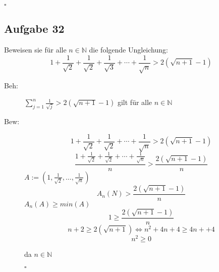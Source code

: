 \documentclass[12pt,a4paper,leqno]{article}
\begin{document}
\begin{description}
\begin{description}
			\begin{flushright}$ \square $ \end{flushright}
		\end{description}
\end{description}

\subsection*{Aufgabe 32}
Beweisen sie für alle $n \in \mathbb{N}$ die folgende Ungleichung:
$$ 1+ \frac{1}{\sqrt{2}}+\frac{1}{\sqrt{2}}+\frac{1}{\sqrt{3}}+ \cdots + \frac{1}{\sqrt{n}}> 2(\sqrt{n+1}-1)$$
\begin{description}
	\item[Beh: ]$ \sum \limits _{j =1}^n \frac{1}{\sqrt{j}}>2(\sqrt{n+1} -1) $ gilt für alle $n \in \mathbb{N}$
	\item[Bew: ]
	$$ 1+ \frac{1}{\sqrt{2}}+\frac{1}{\sqrt{2}}+ \cdots + \frac{1}{\sqrt{n}}> 2(\sqrt{n+1}-1) $$
	$$ \frac{1+ \frac{1}{\sqrt{2}}+\frac{1}{\sqrt{2}}+ \cdots + \frac{1}{\sqrt{n}}}{n} > \frac{2(\sqrt{n+1} -1)}{n} $$
	$A:=(1,\frac{1}{\sqrt{2}} , \ldots , \frac{1}{\sqrt{n}})$
	$$A_{n}(N)> \frac{2(\sqrt{n+1} -1)}{n} $$
	$A_{n}(A)\geq min(A)$
	$$1 \geq \frac{2(\sqrt{n+1} -1)}{n}$$
	$$n+2 \geq 2(\sqrt{n+1}) \Leftrightarrow n^2 +4n+4 \geq 4n+ +4 $$
	$$n^2 \geq 0 $$ \begin{flushright}da $n \in \mathbb{N}$ \end{flushright}
\begin{flushright}$ \square $ \end{flushright}
  
\end{description}
\end{document}
